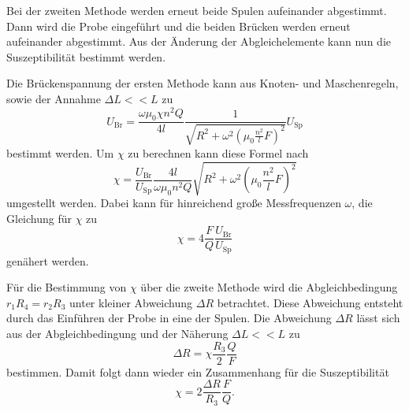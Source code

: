 Bei der zweiten Methode werden erneut beide Spulen aufeinander abgestimmt. Dann wird die Probe eingeführt und die beiden Brücken werden erneut aufeinander abgestimmt. Aus der
Änderung der Abgleichelemente kann nun die Suszeptibilität bestimmt werden.

Die Brückenspannung der ersten Methode kann aus Knoten- und Maschenregeln, sowie der Annahme  $\Delta L << L$ zu
\begin{equation*}
    U_{\text{Br}} = \frac{\omega\mu_0\chi n^2Q}{4l}\frac{1}{\sqrt{R^2 + \omega^2\left(\mu_0\frac{n^2}{l}F\right)^2}}U_{\text{Sp}}
\end{equation*}
bestimmt werden.
Um $\chi$ zu berechnen kann diese Formel nach
\begin{equation}
    \label{eqn:chi_theo}
    \chi = \frac{U_{\text{Br}}}{U_{\text{Sp}}}\frac{4l}{\omega\mu_0n^2Q}\sqrt{R^2 + \omega^2\left(\mu_0\frac{n^2}{l}F\right)^2}
\end{equation}
umgestellt werden.
Dabei kann für hinreichend große Messfrequenzen $\omega$, die Gleichung für $\chi$ zu
\begin{equation}
    \label{eqn:chi:näherung}
    \chi = 4 \frac{F}{Q}\frac{U_{\text{Br}}}{U_{\text{Sp}}}
\end{equation}
genähert werden.

Für die Bestimmung von $\chi$ über die zweite Methode wird die Abgleichbedingung $r_1R_4 = r_2R_3$ unter kleiner Abweichung $\Delta R$ betrachtet. Diese Abweichung entsteht
durch das Einführen der Probe in eine der Spulen. Die Abweichung $\Delta R$ lässt sich aus der Abgleichbedingung und der Näherung $\Delta L << L$ zu
\begin{equation*}
    \Delta R = \chi\frac{R_3}{2}\frac{Q}{F}
\end{equation*}
bestimmen.
Damit folgt dann wieder ein Zusammenhang für die Suszeptibilität
\begin{equation}
    \label{eqn:chimethode2}
    \chi = 2\frac{\Delta R}{R_3}\frac{F}{Q}.
\end{equation}

